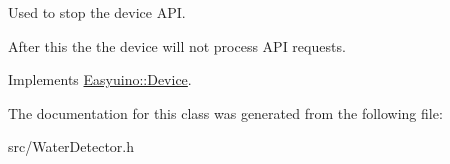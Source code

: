 Used to stop the device A\+PI. 

After this the the device will not process A\+PI requests. 

Implements \hyperlink{class_easyuino_1_1_device_ab31018ef64adc84aa2ea575b2297548f}{Easyuino\+::\+Device}.



The documentation for this class was generated from the following file\+:\begin{DoxyCompactItemize}
\item 
src/Water\+Detector.\+h\end{DoxyCompactItemize}
